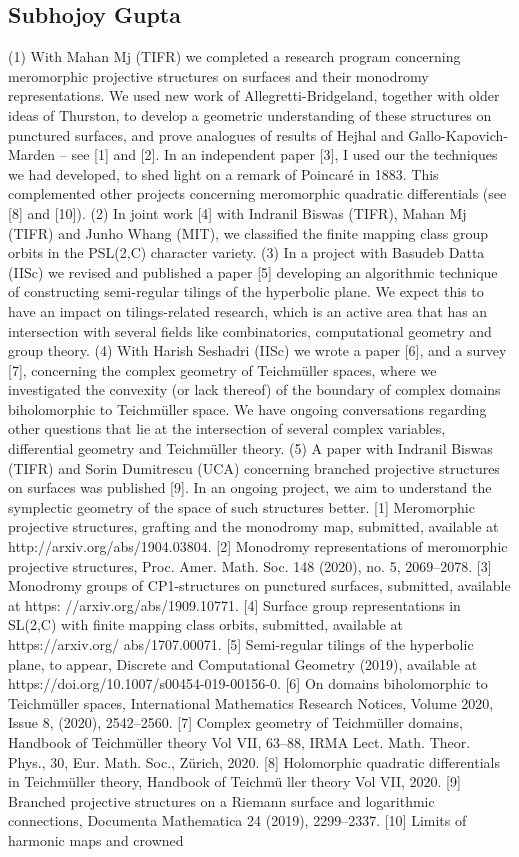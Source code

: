 \subsection{Subhojoy Gupta}

(1) With Mahan Mj (TIFR)  we completed a  research program concerning meromorphic projective structures on surfaces and their monodromy representations. We used new  work of Allegretti-Bridgeland, together with older ideas of Thurston, to develop a geometric understanding of these structures on punctured surfaces, and prove analogues of results of Hejhal and Gallo-Kapovich-Marden -- see [1] and [2]. In an independent paper [3], I used our the techniques we had developed, to shed light on a remark of Poincaré in 1883. This complemented other projects concerning meromorphic quadratic differentials (see [8] and [10]).  (2) In joint work [4] with Indranil Biswas (TIFR), Mahan Mj (TIFR) and Junho Whang (MIT), we classified the finite mapping class group orbits in the PSL(2,C) character variety.  (3) In a project with Basudeb Datta (IISc) we revised and published a paper [5] developing an algorithmic technique of constructing semi-regular tilings of the hyperbolic plane. We expect this to have an impact on tilings-related research, which is an active area that has an intersection with several fields like combinatorics, computational geometry and group theory.   (4)  With Harish Seshadri (IISc) we wrote a paper [6], and a survey [7], concerning the complex geometry of Teichmüller spaces, where we investigated the convexity (or lack thereof) of the boundary of complex domains biholomorphic to Teichmüller space. We have ongoing conversations regarding other questions that lie at the intersection of several complex variables, differential geometry and Teichmüller theory.   (5) A paper with Indranil Biswas (TIFR) and Sorin Dumitrescu (UCA)  concerning branched projective structures on surfaces was published [9]. In an ongoing project, we aim to understand the symplectic geometry of the space of such structures better.  [1] Meromorphic projective structures, grafting and the monodromy map, submitted, available at http://arxiv.org/abs/1904.03804. [2] Monodromy representations of meromorphic projective structures, Proc. Amer. Math. Soc. 148 (2020), no. 5, 2069–2078. [3] Monodromy groups of CP1-structures on punctured surfaces, submitted, available at https: //arxiv.org/abs/1909.10771. [4] Surface group representations in SL(2,C) with finite mapping class orbits, submitted, available at https://arxiv.org/ abs/1707.00071. [5] Semi-regular tilings of the hyperbolic plane, to appear, Discrete and Computational Geometry (2019), available at https://doi.org/10.1007/s00454-019-00156-0. [6] On domains biholomorphic to Teichmüller spaces, International Mathematics Research Notices, Volume 2020, Issue 8, (2020), 2542–2560. [7] Complex geometry of Teichmüller domains, Handbook of Teichmüller theory Vol VII, 63–88, IRMA Lect. Math. Theor. Phys., 30, Eur. Math. Soc., Zürich, 2020. [8] Holomorphic quadratic differentials in Teichmüller theory, Handbook of Teichmü ller theory Vol VII, 2020. [9] Branched projective structures on a Riemann surface and logarithmic connections, Documenta Mathematica 24 (2019), 2299–2337. [10] Limits of harmonic maps and crowned 